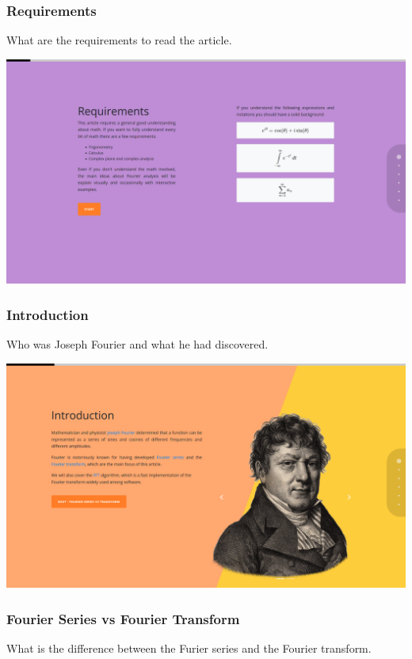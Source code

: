 \documentclass{article}
\begin{document}
\subsubsection{Requirements}

What are the requirements to read the article.

\includegraphics[width=\textwidth]{chap2.png}

\subsubsection{Introduction}

Who was Joseph Fourier and what he had discovered.

\includegraphics[width=\textwidth]{chap3.png}

\subsubsection{Fourier Series vs Fourier Transform}

What is the difference between the Furier series and the Fourier transform.
\end{document}

